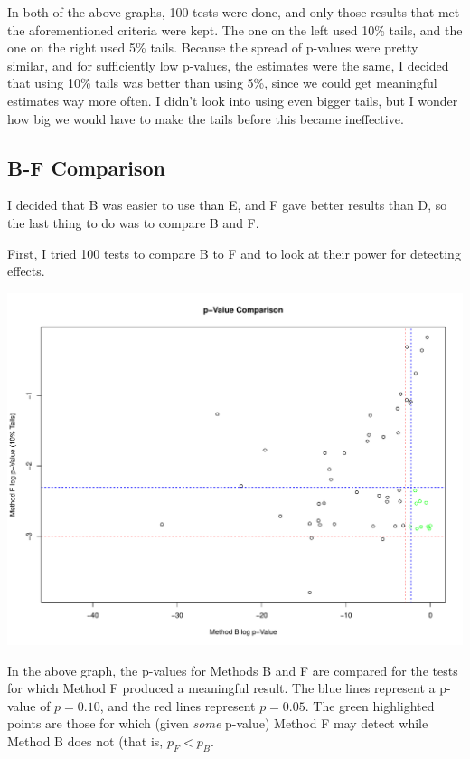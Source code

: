 \documentclass[11pt]{article} %
\begin{document}
In both of the above graphs, 100 tests were done, and only those results that met the aforementioned criteria were kept. The one on the left used 10\% tails, and the one on the right used 5\% tails. Because the spread of p-values were pretty similar, and for sufficiently low p-values, the estimates were the same, I decided that using 10\% tails was better than using 5\%, since we could get meaningful estimates way more often. I didn't look into using even bigger tails, but I wonder how big we would have to make the tails before this became ineffective.

\subsection{B-F Comparison}
I decided that B was easier to use than E, and F gave better results than D, so the last thing to do was to compare B and F.

First, I tried 100 tests to compare B to F and to look at their power for detecting effects.

\includegraphics[scale=0.5]{BF Comparison Comprehensive p.pdf}

In the above graph, the p-values for Methods B and F are compared for the tests for which Method F produced a meaningful result. The blue lines represent a p-value of $p=0.10$, and the red lines represent $p=0.05$. The green highlighted points are those for which (given \emph{some} p-value) Method F may detect while Method B does not (that is, $p_F < p_B$.
\end{document}
